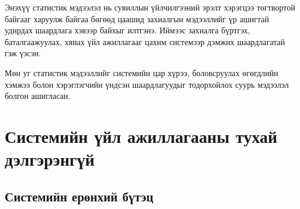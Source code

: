 Энэхүү статистик мэдээлэл нь сувиллын үйлчилгээний эрэлт хэрэгцээ тогтвортой байгааг харуулж байгаа бөгөөд цаашид захиалгын мэдээллийг үр ашигтай удирдах шаардлага хэвээр байхыг илтгэнэ. Иймээс захиалга бүртгэх, баталгаажуулах, хянах үйл ажиллагааг цахим системээр дэмжих шаардлагатай гэж үзсэн.

Мөн уг статистик мэдээллийг системийн цар хүрээ, боловсруулах өгөгдлийн хэмжээ болон хэрэглэгчийн үндсэн шаардлагуудыг тодорхойлох суурь мэдээлэл болгон ашигласан.
\section{Системийн үйл ажиллагааны тухай дэлгэрэнгүй}

\subsection{Системийн ерөнхий бүтэц}

